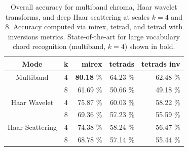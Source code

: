 \documentclass{article}
\begin{document}
\begin{table}[t]
	\begin{center}
	\begin{tabular} {| c | c | r | r | r |}
	\hline
	Mode & k & mirex & tetrads & tetrads inv \\
	\hline
	Multiband & 4 & \textbf{80.18} \% & 64.23 \% & 62.48 \% \\
	& 8 & 61.69 \% & 50.66 \% & 49.18 \% \\
	
	Haar Wavelet & 4 & 75.87 \% & 60.03 \% & 58.22 \%\\
	 & 8 & 69.36 \% & 57.23 \% & 55.59 \% \\
	 
	 Haar Scattering & 4 & 74.38 \% & 58.24 \% & 56.47 \% \\
	  & 8 & 68.78 \% & 57.14 \% & 55.44 \% \\
	\hline
	\end{tabular}
	\end{center}
	\protect\caption{Overall accuracy for multiband chroma, Haar wavelet transforms, and deep Haar 	scattering at scales $k=4$ and 8. Accuracy computed via mirex, tetrad, and tetrad with inversions 	metrics. State-of-the-art for large vocabulary chord recognition (multiband, $k=4$) shown in 		bold. 
	\label{table:overall-scores}}
\end{table}





%
%
%
%
\end{document}
